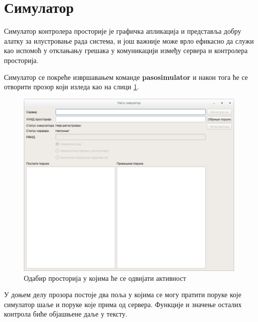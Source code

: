 \documentclass[a4paper, 12pt, diplomski]{etfcyr}
\begin{document}
		\newpage

		\section{Симулатор}
			\begin{justify}
				Симулатор контролера просторије је графичка апликација и представља добру алатку за илустровање рада система, и још важније може врло ефикасно да служи као испомоћ у отклањању грешака у комуникацији између сервера и контролера просторија.

				Симулатор се покреће извршавањем команде \textbf{pasosimulator} и након тога ће се отворити прозор који изледа као на слици \ref{figure:simulator_main_window}.
				\begin{figure}[h]
					\begin{center}
						\includegraphics[width=1.0\textwidth]{manual/simulator_main_window.png}
					\end{center}
					\caption{Одабир просторија у којима ће се одвијати активност}
					\label{figure:simulator_main_window}
				\end{figure}
				У доњем делу прозора постоје два поља у којима се могу пратити поруке које симулатор шаље и поруке које прима од сервера. Функције и значење осталих контрола биће објашњене даље у тексту.


\end{justify}
\end{document}
